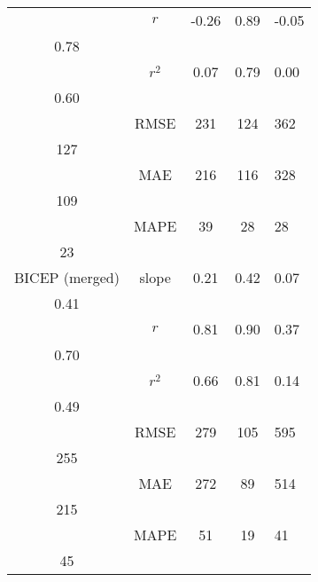 \begin{table}[h]
\begin{tabular}{cccc}
& $r$ & -0.26 & 0.89 & -0.05 &  \\
0.78 \\
& $r^2$ & 0.07 & 0.79 & 0.00 &  \\
0.60 \\
& RMSE & 231 & 124 & 362 &  \\
127 \\
& MAE & 216 & 116 & 328 &  \\
109 \\
& MAPE & 39 & 28 & 28 &  \\
23 \\
\cmidrule(lr){1-6}
BICEP (merged) & slope & 0.21 & 0.42 & 0.07 &  \\
0.41 \\
& $r$ & 0.81 & 0.90 & 0.37 &  \\
0.70 \\
& $r^2$ & 0.66 & 0.81 & 0.14 &  \\
0.49 \\
& RMSE & 279 & 105 & 595 &  \\
255 \\
& MAE & 272 & 89 & 514 &  \\
215 \\
& MAPE & 51 & 19 & 41 &  \\
45 \\
\bottomrule
\end{tabular}
\end{table}
